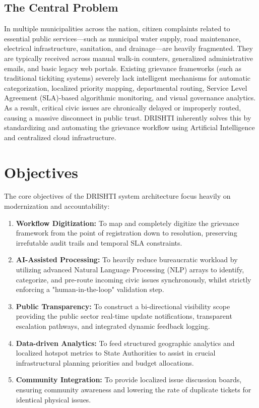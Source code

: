 \documentclass[12pt,a4paper]{report}
\begin{document}
\subsection*{The Central Problem}

In multiple municipalities across the nation, citizen complaints related to essential public services—such as municipal water supply, road maintenance, electrical infrastructure, sanitation, and drainage—are heavily fragmented. They are typically received across manual walk-in counters, generalized administrative emails, and basic legacy web portals. Existing grievance frameworks (such as traditional tickiting systems) severely lack intelligent mechanisms for automatic categorization, localized priority mapping, departmental routing, Service Level Agreement (SLA)-based algorithmic monitoring, and visual governance analytics. As a result, critical civic issues are chronically delayed or improperly routed, causing a massive disconnect in public trust. DRISHTI inherently solves this by standardizing and automating the grievance workflow using Artificial Intelligence and centralized cloud infrastructure.

\section{Objectives}
The core objectives of the DRISHTI system architecture focus heavily on modernization and accountability:
\begin{enumerate}
    \item \textbf{Workflow Digitization:} To map and completely digitize the grievance framework from the point of registration down to resolution, preserving irrefutable audit trails and temporal SLA constraints.
    \item \textbf{AI-Assisted Processing:} To heavily reduce bureaucratic workload by utilizing advanced Natural Language Processing (NLP) arrays to identify, categorize, and pre-route incoming civic issues synchronously, whilst strictly enforcing a "human-in-the-loop" validation step.
    \item \textbf{Public Transparency:} To construct a bi-directional visibility scope providing the public sector real-time update notifications, transparent escalation pathways, and integrated dynamic feedback logging.
    \item \textbf{Data-driven Analytics:} To feed structured geographic analytics and localized hotspot metrics to State Authorities to assist in crucial infrastructural planning priorities and budget allocations.
    \item \textbf{Community Integration:} To provide localized issue discussion boards, ensuring community awareness and lowering the rate of duplicate tickets for identical physical issues.
\end{enumerate}
\end{document}
